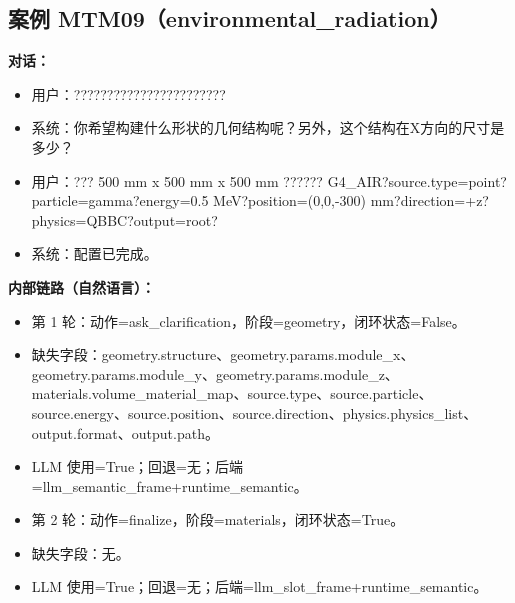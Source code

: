 \documentclass[11pt]{ctexart}
\begin{document}
\subsection{案例 MTM09（environmental\_radiation）}
\textbf{对话：}
\begin{itemize}
\item 用户：???????????????????????
\item 系统：你希望构建什么形状的几何结构呢？另外，这个结构在X方向的尺寸是多少？
\item 用户：??? 500 mm x 500 mm x 500 mm ?????? G4\_AIR?source.type=point?particle=gamma?energy=0.5 MeV?position=(0,0,-300) mm?direction=+z?physics=QBBC?output=root?
\item 系统：配置已完成。
\end{itemize}
\textbf{内部链路（自然语言）：}
\begin{itemize}
\item 第 1 轮：动作=ask\_clarification，阶段=geometry，闭环状态=False。
\item 缺失字段：geometry.structure、geometry.params.module\_x、geometry.params.module\_y、geometry.params.module\_z、materials.volume\_material\_map、source.type、source.particle、source.energy、source.position、source.direction、physics.physics\_list、output.format、output.path。
\item LLM 使用=True；回退=无；后端=llm\_semantic\_frame+runtime\_semantic。
\item 第 2 轮：动作=finalize，阶段=materials，闭环状态=True。
\item 缺失字段：无。
\item LLM 使用=True；回退=无；后端=llm\_slot\_frame+runtime\_semantic。
\end{itemize}
\end{document}
